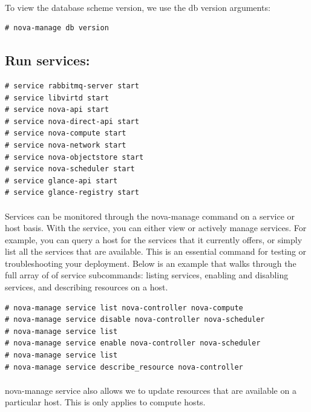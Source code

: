 \paragraph{}To view the database scheme version, we use the db version arguments:\par

\begin{lstlisting}[language={[Latex]TeX}, frame=single]
# nova-manage db version
\end{lstlisting}

\newpage

\subsection{Run services:}
\begin{lstlisting}[language={[Latex]TeX}, frame=single]
# service rabbitmq-server start
# service libvirtd start
# service nova-api start
# service nova-direct-api start
# service nova-compute start
# service nova-network start
# service nova-objectstore start
# service nova-scheduler start
# service glance-api start
# service glance-registry start
\end{lstlisting}
\paragraph{}Services can be monitored through the nova-manage command on a service or host basis. 
With the service, you can either view or actively manage services. For example, you can query a host for the services that it currently offers,
 or simply list all the services that are available. This is an essential command for testing or troubleshooting your deployment. 
Below is an example that walks through the full array of of service subcommands:
 listing services, enabling and disabling services, and describing resources on a host.\par



\begin{lstlisting}[language={[Latex]TeX}, frame=single]
# nova-manage service list nova-controller nova-compute
# nova-manage service disable nova-controller nova-scheduler
# nova-manage service list
# nova-manage service enable nova-controller nova-scheduler
# nova-manage service list
# nova-manage service describe_resource nova-controller

\end{lstlisting}

\paragraph{}nova-manage service also allows we to update resources that are available on a particular host. This is only applies to compute hosts.

